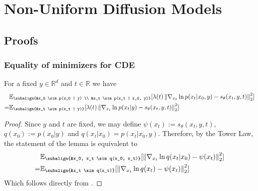 
\chapter{Non-Uniform Diffusion Models}  %

\section{Proofs}
\label{ch2:appendix:proofs}
\subsection{Equality of minimizers for CDE}
\label{ch2:appendix:minimizers}
\begin{lemma}
    \label{ch2:Vincent}
    For a fixed $y \in \mathbb{R}^d$ and $t \in \mathbb{R}$ we have
    \begin{align*}
        &\mathbb{E}_{\subalign{&x_0 \sim p(x_0 | y) \\ &x_t \sim p(x_t | x_0, y)}} 
            [\lambda(t) \norm{\nabla_{x_t} \ln{p(x_t | x_0, y)} - s_\theta(x_t, y, t)}_2^2]\\
        =& \mathbb{E}_{\subalign{&x_t \sim p(x_t |  y)}} 
            [\lambda(t) \norm{\nabla_{x_t} \ln{p(x_t | y)} - s_\theta(x_t, y, t)}_2^2]
    \end{align*}
\begin{proof}
    Since $y$ and $t$ are fixed, we may define $\psi(x_t) := s_\theta(x_t, y, t)$, $q(x_0) := p(x_0 | y)$ and $q(x_t | x_0) = p(x_t | x_0, y)$.
    Therefore, by the Tower Law, the statement of the lemma is equivalent to
    \begin{align*}
        &\mathbb{E}_{\subalign{&x_0, x_t \sim q(x_0, x_t)}} 
        [\norm{\nabla_{x_t} \ln{q(x_t | x_0)} - \psi(x_t)}_2^2]\\
    =& \mathbb{E}_{\subalign{&x_t \sim q(x_t)}} 
        [\norm{\nabla_{x_t} \ln{q(x_t)} - \psi(x_t)}_2^2]
    \end{align*}
    Which follows directly from \cite[Eq. 11]{vincent2011connection}.
\end{proof}
    
\end{lemma}
